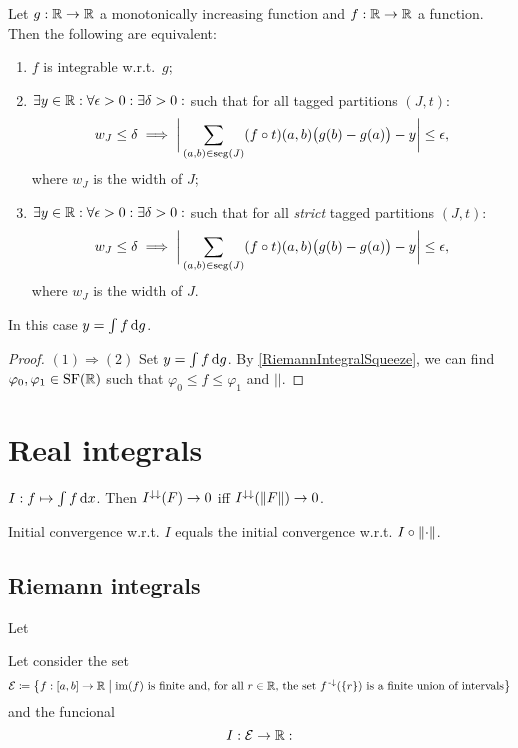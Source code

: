 \begin{proposition}
Let $g: \mathbb{R}\to\mathbb{R}$ a monotonically increasing function and $f: \mathbb{R}\to \mathbb{R}$ a function. Then the following are equivalent:
\begin{enumerate}
\item $f$ is integrable w.r.t.\ $g$;
\item $\exists y\in \mathbb{R}: \forall \epsilon > 0: \exists \delta > 0:$ such that for all tagged partitions $(J,t)$:
\[  w_J \leq \delta \implies \bigg|\sum_{(a,b)\in \operatorname{seg}(J)}(f\circ t)(a,b)\big(g(b) - g(a)\big) - y \bigg| \leq \epsilon, \]
where $w_J$ is the width of $J$;
\item $\exists y\in \mathbb{R}: \forall \epsilon > 0: \exists \delta > 0:$ such that for all \emph{strict} tagged partitions $(J,t)$:
\[  w_J \leq \delta \implies \bigg|\sum_{(a,b)\in \operatorname{seg}(J)}(f\circ t)(a,b)\big(g(b) - g(a)\big) - y \bigg| \leq \epsilon, \]
where $w_J$ is the width of $J$.
\end{enumerate}
In this case $y = \int f \operatorname{d \!}{g}$.
\end{proposition}
\begin{proof}
$(1) \Rightarrow (2)$ Set $y = \int f \operatorname{d \!}{g}$. By \ref{RiemannIntegralSqueeze}, we can find $\varphi_0, \varphi_1 \in \operatorname{SF}(\mathbb{R})$ such that $\varphi_0 \leq f \leq \varphi_1$ and $||$.


\end{proof}


\section{Real integrals}

\begin{proposition}
$I: f\mapsto \int f \operatorname{d \!}{x}$. Then $I^{\downarrow\downarrow}(F) \to 0$ iff $I^{\downarrow\downarrow}(\lVert F\rVert) \to 0$.
\end{proposition}
\begin{corollary}
Initial convergence w.r.t. $I$ equals the initial convergence w.r.t. $I\circ \lVert\cdot\rVert$.
\end{corollary}

\subsection{Riemann integrals}
\begin{definition}
Let
\end{definition}


\begin{definition}
Let consider the set
\[ \mathcal{E} \defeq \setbuilder{f: \interval{a,b}\to \R}{\text{$\im(f)$ is finite and, for all $r\in \R$, the set $f^\preimf(\{r\})$ is a finite union of intervals}} \]
and the funcional
\[ I : \mathcal{E} \to \mathbb{R}:  \]
\end{definition}




